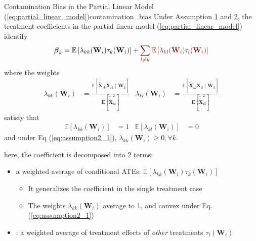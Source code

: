 \documentclass[twoside]{article}
\begin{document}
\begin{proposition}{Contamination Bias in the Partial Linear Model (\ref{eq:partial_linear_model})}{contamination_bias}
    Under Assumption \hyperref[assumption1]{1} and \hyperref[assumption1]{2}, the treatment coefficients in the partial linear model (\ref{eq:partial_linear_model}) identify 
    \begin{equation}
        \boldsymbol{\beta}_k = \mathbb{E}\left[ \lambda_{kk}(\mathbf{W}_i)\tau_k(\mathbf{W}_i) \right] + \textcolor{myred}{\sum_{l\neq k}\mathbb{E}\left[\lambda_{kl}(\mathbf{W}_i)\tau_l(\mathbf{W}_i)\right] }
    \end{equation}
    where the weights
    \begin{align*}
        \lambda_{kk}(\mathbf{W}_i) &= \frac{\mathbb{E}\left[\tilde{\tilde{\mathbf{X}}}_{ik}\mathbf{X}_{ik}\mid \mathbf{W}_k\right]}{\mathbf{E}\left[\tilde{\tilde{\mathbf{X}}}^2_{ik}\right]} & \lambda_{kl}(\mathbf{W}_i) &= \frac{\mathbb{E}\left[\tilde{\tilde{\mathbf{X}}}_{ik}\mathbf{X}_{il}\mid \mathbf{W}_k\right]}{\mathbf{E}\left[\tilde{\tilde{\mathbf{X}}}^2_{ik}\right]}
    \end{align*}
    satisfy that 
    \begin{align*}
        \mathbb{E}\left[\lambda_{kk}(\mathbf{W}_i)\right] &= 1 & \mathbb{E}\left[\lambda_{kl}(\mathbf{W}_i)\right] & =0
    \end{align*}
    and under Eq (\ref{eq:assumption2_1}), $\lambda_{kk}(\mathbf{W}_i)\geq 0, \forall k$.
\end{proposition}

here, the coefficient is decomposed into 2 terms:
\begin{itemize}
    \item a weighted average of conditional ATEs: $\mathbb{E}\left[ \lambda_{kk}(\mathbf{W}_i)\tau_k(\mathbf{W}_i) \right]$
    \begin{itemize}
        \item It generalizes the coefficient in the single treatment case
        \item The weights $\lambda_{kk}\left(\mathbf{W}_i\right)$ average to 1, and convex under Eq. (\ref{eq:assumption2_1})
    \end{itemize}
    
    \item {}: a weighted average of treatment effects of \textit{other} treatments $\tau_l(\mathbf{W}_i)$
\end{itemize}
\end{document}
